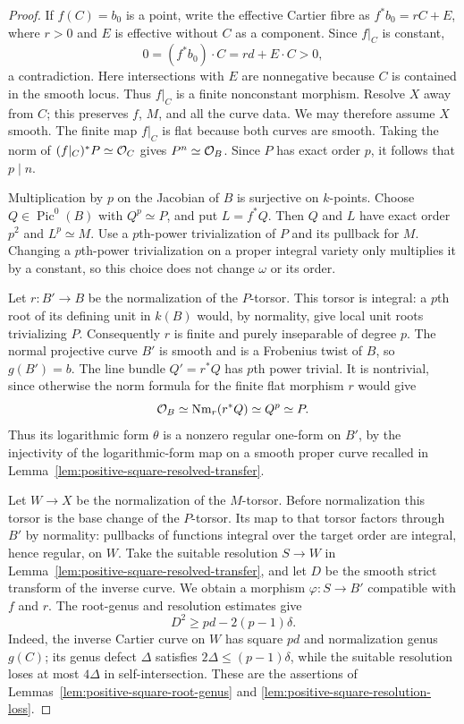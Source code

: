 \begin{proof}
If $f(C)=b_0$ is a point, write the effective Cartier fibre as
$f^*b_0=rC+E$, where $r>0$ and $E$ is effective without $C$ as a
component.  Since $f|_C$ is constant,
\[
 0=(f^*b_0)\cdot C=rd+E\cdot C>0,
\]
a contradiction.  Here intersections with $E$ are nonnegative because
$C$ is contained in the smooth locus.  Thus $f|_C$ is a finite
nonconstant morphism.  Resolve $X$ away from $C$; this preserves $f$,
$M$, and all the curve data.  We may therefore assume $X$ smooth.
The finite map $f|_C$ is flat because both curves are smooth.
Taking the norm of $(f|_C)^*P\simeq\mathcal O_C$ gives $P^n\simeq\mathcal O_B$.
Since $P$ has exact order $p$, it follows that $p\mid n$.

Multiplication by $p$ on the Jacobian of $B$ is surjective on
$k$-points.  Choose $Q\in\operatorname{Pic}^0(B)$ with $Q^p\simeq P$,
and put $L=f^*Q$.  Then $Q$ and $L$ have exact order $p^2$ and
$L^p\simeq M$.  Use a $p$th-power trivialization of $P$ and its pullback
for $M$.  Changing a $p$th-power trivialization on a proper integral
variety only multiplies it by a constant, so this choice does not
change $\omega$ or its order.

Let $r:B'\to B$ be the normalization of the $P$-torsor.  This torsor
is integral: a $p$th root of its defining unit in $k(B)$ would, by
normality, give local unit roots trivializing $P$.  Consequently $r$
is finite and purely inseparable of degree $p$.  The normal projective
curve $B'$ is smooth and is a Frobenius twist of $B$, so $g(B')=b$.
The line bundle $Q'=r^*Q$ has $p$th power trivial.  It is nontrivial, since
otherwise the norm formula for the finite flat morphism $r$ would give
\[
 \mathcal O_B\simeq\operatorname{Nm}_r(r^*Q)\simeq Q^p\simeq P.
\]
Thus its logarithmic form $\theta$ is a nonzero regular one-form on
$B'$, by the injectivity of the logarithmic-form map on a smooth
proper curve recalled in
Lemma~\ref{lem:positive-square-resolved-transfer}.

Let $W\to X$ be the normalization of the $M$-torsor.  Before
normalization this torsor is the base change of the $P$-torsor.
Its map to that torsor factors through $B'$ by normality: pullbacks
of functions integral over the target order are integral, hence
regular, on $W$.  Take the suitable resolution $S\to W$ in
Lemma~\ref{lem:positive-square-resolved-transfer}, and let $D$ be
the smooth strict transform of the inverse curve.  We obtain a
morphism $\varphi:S\to B'$ compatible with $f$ and $r$.
The root-genus and resolution estimates give
\begin{equation}\label{eq:boundary-curve-pullback-square}
 D^2\geq pd-2(p-1)\delta.
\end{equation}
Indeed, the inverse Cartier curve on $W$ has square $pd$ and
normalization genus $g(C)$; its genus defect $\Delta$ satisfies
$2\Delta\leq(p-1)\delta$, while the suitable resolution loses at most
$4\Delta$ in self-intersection.  These are the assertions of
Lemmas~\ref{lem:positive-square-root-genus} and
\ref{lem:positive-square-resolution-loss}.


\end{proof}
